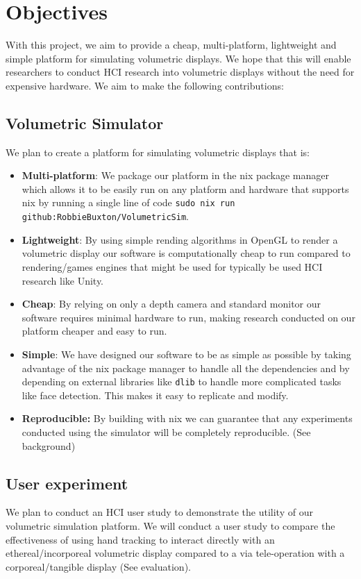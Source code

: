 \section{Objectives}

With this project, we aim to provide a cheap, multi-platform, lightweight and simple platform for simulating volumetric displays. We hope that this will enable researchers to conduct HCI research into volumetric displays without the need for expensive hardware. We aim to make the following contributions:
\subsection{Volumetric Simulator}
We plan to create a platform for simulating volumetric displays that is:
\begin{itemize}
  \item \textbf{Multi-platform}: We package our platform in the nix package manager \cite{dolstra2004nix} which allows it to be easily run on any platform and hardware that supports nix by running a single line of code \texttt{sudo nix run github:RobbieBuxton/VolumetricSim}.

  \item \textbf{Lightweight}: By using simple rending algorithms in OpenGL \cite{rost2009opengl} to render a volumetric display our software is computationally cheap to run compared to rendering/games engines that might be used for typically be used HCI research like Unity.

  \item \textbf{Cheap}: By relying on only a depth camera and standard monitor our software requires minimal hardware to run, making research conducted on our platform cheaper and easy to run.

  \item \textbf{Simple}: We have designed our software to be as simple as possible by taking advantage of the nix package manager to handle all the dependencies and by depending on external libraries like \texttt{dlib} \cite{10.5555/1577069.1755843} to handle more complicated tasks like face detection. This makes it easy to replicate and modify.

  \item \textbf{Reproducible:} By building with nix we can guarantee that any experiments conducted using the simulator will be completely reproducible. (See background)
\end{itemize}

\subsection{User experiment}
We plan to conduct an HCI user study to demonstrate the utility of our volumetric simulation platform. We will conduct a user study to compare the effectiveness of using hand tracking to interact directly with an ethereal/incorporeal volumetric display compared to a via tele-operation with a corporeal/tangible display (See evaluation).

